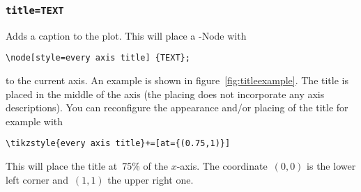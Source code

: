 \subsubsection{\texttt{title=TEXT}}
Adds a caption to the plot. This will place a \Tikz-Node with
\begin{lstlisting}
\node[style=every axis title] {TEXT};
\end{lstlisting}
to the current axis. An example is shown in figure~\ref{fig:titleexample}. The title is placed in the middle of the axis (the placing does not incorporate any axis descriptions). You can reconfigure the appearance and/or placing of the title for example with
\begin{lstlisting}
\tikzstyle{every axis title}+=[at={(0.75,1)}]
\end{lstlisting}
This will place the title at~75\% of the $x$-axis. The coordinate~$(0,0)$ is the lower left corner and~$(1,1)$ the upper right one.


